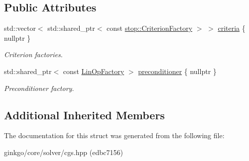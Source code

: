 \subsection*{Public Attributes}
\begin{DoxyCompactItemize}
\item 
\mbox{\label{structgko_1_1solver_1_1Cgs_1_1parameters__type_a02051dffae27205cd269beeaa29f8163}} 
std\+::vector$<$ std\+::shared\+\_\+ptr$<$ const \hyperlink{namespacegko_1_1stop_ab12a51109c50b35ec36dc5a393d6a9a0}{stop\+::\+Criterion\+Factory} $>$ $>$ \hyperlink{structgko_1_1solver_1_1Cgs_1_1parameters__type_a02051dffae27205cd269beeaa29f8163}{criteria} \{ nullptr \}
\begin{DoxyCompactList}\small\item\em Criterion factories. \end{DoxyCompactList}\item 
\mbox{\label{structgko_1_1solver_1_1Cgs_1_1parameters__type_abbe93702c7bcb93bc1d831d6b947a0f9}} 
std\+::shared\+\_\+ptr$<$ const \hyperlink{classgko_1_1LinOpFactory}{Lin\+Op\+Factory} $>$ \hyperlink{structgko_1_1solver_1_1Cgs_1_1parameters__type_abbe93702c7bcb93bc1d831d6b947a0f9}{preconditioner} \{ nullptr \}
\begin{DoxyCompactList}\small\item\em Preconditioner factory. \end{DoxyCompactList}\end{DoxyCompactItemize}
\subsection*{Additional Inherited Members}


The documentation for this struct was generated from the following file\+:\begin{DoxyCompactItemize}
\item 
ginkgo/core/solver/cgs.\+hpp (edbc7156)\end{DoxyCompactItemize}

